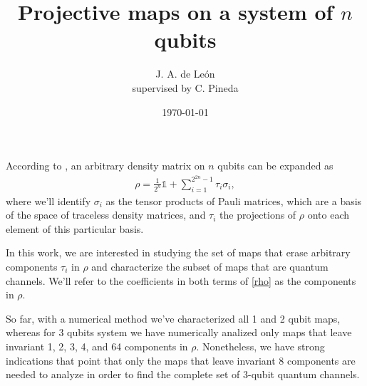 \documentclass[11pt,dvipsnames]{article}
\begin{document}
\title{Projective maps on a system of $n$ qubits} 
\author{J. A. de León\\
				\small{supervised by C. Pineda}}


\date{\today}  

\maketitle


According to \cite{bengtsson_zyczkowski_2017}, an arbitrary density matrix on $n$  
qubits can be expanded as
\begin{align}
  \rho = \frac{1}{2^n}\mathbb{1} + \sum _{i=1}^{2^{2n}-1}\tau _i\sigma _i,
	\label{rho}
\end{align}
where we'll identify $\sigma _i$ as the tensor products of Pauli 
matrices, which are a basis of the space of traceless density matrices, and 
$\tau_i$ the projections of $\rho$ onto each element of this particular
basis.



In this work, we are interested in studying the set of maps that erase
arbitrary components $\tau_i$ in $\rho$ and characterize the subset of maps
that are quantum channels. We'll refer to the coefficients in both terms of 
\eqref{rho} as the components in $\rho$.


So far, with a numerical method we've characterized all 1 and 2 qubit maps, 
whereas for 3 qubits system we have numerically analized only maps that leave 
invariant 1, 2, 3, 4, and 64 components in $\rho$. Nonetheless, we have strong
indications that point that only the maps that leave invariant 8 components are 
needed to analyze in order to find the complete set of 3-qubit quantum 
channels.
\newline
\end{document}
